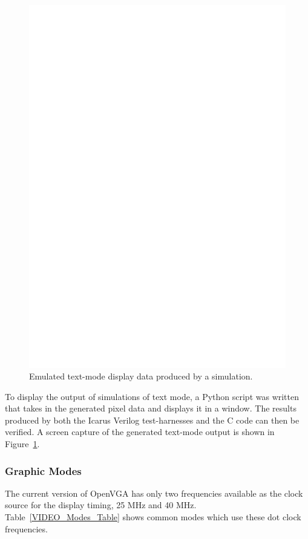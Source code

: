 \begin{figure}[h!]
\begin{center}
\includegraphics[width=\linewidth]{images/crt_sim.eps}
\caption[Emulated text-mode display data produced by a simulation]{Emulated
text-mode display data produced by a simulation.}
\label{CRT_Sim}
\end{center}
\end{figure}

To display the output of simulations of text mode, a Python script was written
that takes in the generated pixel data and displays it in a window. The results
produced by both the Icarus Verilog test-harnesses and the C code can then be
verified. A screen capture of the generated text-mode output is shown in
Figure~\ref{CRT_Sim}.

\subsubsection{Graphic Modes}
\label{VIDEO_Modes}
The current version of OpenVGA has only two frequencies available as the clock
source for the display timing, 25 MHz and 40 MHz. Table~\ref{VIDEO_Modes_Table}
shows common modes which use these dot clock frequencies.


